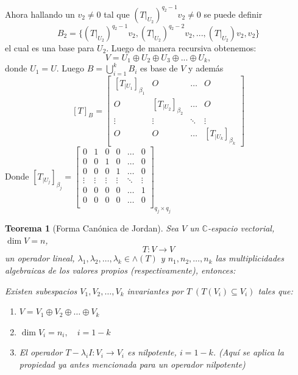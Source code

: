 \documentclass[12pt,a4paper]{article}
\newtheorem{mytheo}{Teorema}[section]
\begin{document}
\begin{multicols}{2}
Ahora hallando un $v_{2}\neq0$ tal que $ (T|_{U_{2}})^{q_{2}-1}v_{2}\neq 0$  se puede definir
$$B_{2}=\{(T|_{U_{2}})^{q_{2}-1}v_{2}, (T|_{U_{2}})^{q_{2}-2}v_{2}, ..., (T|_{U_{2}})v_{2},v_{2} \}$$ el cual es una base para $U_{2}$. Luego de manera recursiva obtenemos: \\
$$V=U_{1}\oplus U_{2}\oplus U_{3}\oplus ... \oplus U_{k},$$ donde $U_{1}=U$. Luego $B=\displaystyle\bigcup\limits_{i=1}^{k}B_{i} $ es base de $V$ y además \\
$$\left [T\right]_{B}=\begin{bmatrix}
	\left[T_{|U_{1}}\right]_{\beta_{1}}	&	O	&	\ldots	&	O\\
	O	&	\left[T_{|U_{2}}\right]_{\beta_{2}}	&	\ldots	&	O\\
	\vdots	&	\vdots	& \ddots	& \vdots\\
	O	&	O	&	\ldots	&	\left[T_{|U_{k}}\right]_{\beta_{k}}
\end{bmatrix}$$
 Donde 	$\left[T_{|U_{j}}\right]_{\beta_{j}}=\begin{bmatrix}
		0	&	1	&	0	&	0	&	\ldots	&	0\\
		0	&	0	&	1	&	0	&	\ldots	&	0\\
		0	&	0	&	0	&	1	&	\ldots	&	0\\
		\vdots	&	\vdots	&	\vdots	&	\vdots	&	\ddots	&	\vdots\\
		0	&	0	&	0	&	0	&	\ldots	&	1\\
		0	&	0	&	0	&	0	&	\ldots	&	0\\
	\end{bmatrix}_{q_{j}\times q_{j}}$

\vspace{0.7cm}

\begin{mytheo}[Forma Canónica de Jordan]
	Sea $V$ un $\mathbb{C}$-espacio vectorial, $\dim V = n$, $$T:V\rightarrow V$$ un operador lineal, $\lambda_{1},\lambda_{2},\ldots,\lambda_{k}\in \wedge(T)$ y $n_{1}, n_{2},\ldots , n_{k}$ las multiplicidades algebraicas de los valores propios (respectivamente), entonces:

Existen subespacios $V_{1}, V_{2},\ldots, V_{k}$ invariantes por $T\;\left(T(V_{i})\subseteq V_{i}\right)$ tales que:
\begin{enumerate}
	\item	$V = V_{1}\oplus V_{2}\oplus\ldots\oplus V_{k}$
	\item $\dim V_{i} = n_{i},\quad i=1-k$
	\item El operador $T-\lambda_{i}I:V_{i}\rightarrow V_{i}$ es nilpotente, $i=1-k$. (Aquí se aplica la propiedad ya antes mencionada para un operador nilpotente)
	

\end{enumerate}
\end{mytheo}
\end{multicols}
\end{document}
